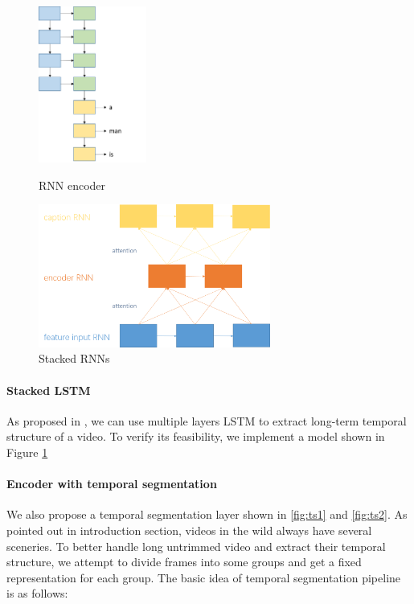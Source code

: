 \begin{figure}[htbp]
\begin{minipage}[t]{0.5\linewidth}
\centering
\includegraphics[width=1.4in]{resources/rnnenc.png}
\caption{RNN encoder}
\label{fig:rnnenc}
\end{minipage}
\begin{minipage}[t]{0.5\linewidth}
\centering
\includegraphics[width=3in]{resources/stack.png}
\caption{Stacked RNNs}
\label{fig:stack}
\end{minipage}
\end{figure}

\paragraph{Stacked LSTM}
As proposed in \cite{pan2015hierarchical}, we can use multiple layers LSTM to extract long-term temporal structure of a video. To verify its feasibility, we implement a model shown in Figure \ref{fig:stack}

\paragraph{Encoder with temporal segmentation}
We also propose a temporal segmentation layer shown in \autoref{fig:ts1} and \autoref{fig:ts2}. As pointed out in introduction section, videos in the wild always have several sceneries. To better handle long untrimmed video and extract their temporal structure, we attempt to divide frames into some groups and get a fixed representation for each group. The basic idea of temporal segmentation pipeline is as follows:

